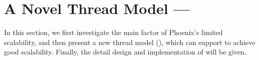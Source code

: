 \section{A Novel Thread Model --- \myth}
\label{sec:design}
In this section, we first investigate the main factor of Phoenix's limited scalability, 
and then present a new thread model (\myth), which can support \myds to achieve good scalability.
Finally, the detail design and implementation of \myth will be given.


%
